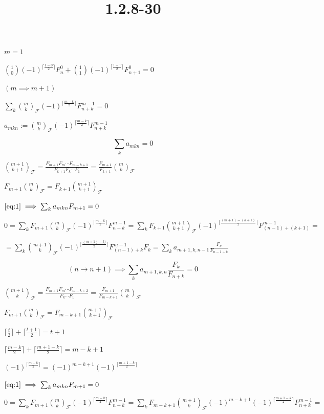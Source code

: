 \documentclass{article}
\title{1.2.8-30}
\begin{document}
\maketitle

$m = 1$

$\binom{1}{0}(-1)^{\lceil\frac{1-0}{2}\rceil} F_{n}^0 + \binom{1}{1}(-1)^{\lceil\frac{1-1}{2}\rceil} F_{n+1}^0 = 0$

$(m \implies m + 1)$

$\sum_{k}\binom{m}{k}_{\mathcal{F}}(-1)^{\lceil\frac{m-k}{2}\rceil}F_{n+k}^{m-1} = 0$

$a_{mkn} := \binom{m}{k}_{\mathcal{F}}(-1)^{\lceil\frac{m-k}{2}\rceil}F_{n+k}^{m-1}$

\[\sum_k a_{mkn} = 0 \tag{1}\label{eq:1}\]

$\binom{m+1}{k+1}_{\mathcal{F}} = \frac{F_{m+1}F_m\cdots F_{m-k+1}}{F_{k+1}F_k\cdots F_1} = \frac{F_{m+1}}{F_{k+1}} \binom{m}{k}_{\mathcal{F}}$

$F_{m+1} \binom{m}{k}_{\mathcal{F}} = F_{k+1} \binom{m+1}{k+1}_{\mathcal{F}}$

$\eqref{eq:1} \implies \sum_k a_{mkn}F_{m+1} = 0$

$0 = \sum_{k} F_{m+1}\binom{m}{k}_{\mathcal{F}}(-1)^{\lceil\frac{m-k}{2}\rceil}F_{n+k}^{m-1} = \sum_{k} F_{k+1}\binom{m+1}{k+1}_{\mathcal{F}}(-1)^{\lceil\frac{(m+1)-(k+1)}{2}\rceil}F_{(n-1)+(k+1)}^{m-1} =$

$= \sum_{k} \binom{m+1}{k}_{\mathcal{F}}(-1)^{\lceil\frac{(m+1)-k)}{2}\rceil}F_{(n-1)+k}^{m-1}F_{k} = \sum_k a_{m+1,k,n-1}\frac{F_k}{F_{n-1+k}}$

\[(n \to n + 1) \implies \sum_k a_{m+1,k,n}\frac{F_k}{F_{n+k}} = 0 \tag{2}\label{eq:2}\]

$\binom{m+1}{k}_{\mathcal{F}} = \frac{F_{m+1}F_m\cdots F_{m-k+2}}{F_k\cdots F_1} = \frac{F_{m+1}}{F_{m-k+1}} \binom{m}{k}_{\mathcal{F}}$

$F_{m+1} \binom{m}{k}_{\mathcal{F}} = F_{m-k+1} \binom{m+1}{k+1}_{\mathcal{F}}$

$\lceil \frac{t}{2} \rceil + \lceil \frac{t+1}{2} \rceil = t+1$

$\lceil \frac{m-k}{2} \rceil + \lceil \frac{m+1-k}{2} \rceil = m-k+1$

$(-1)^{\lceil \frac{m-k}{2} \rceil} = (-1)^{m-k+1} (-1)^{\lceil \frac{m + 1 -k}{2} \rceil}$

$\eqref{eq:1} \implies \sum_k a_{mkn}F_{m+1} = 0$

$0 = \sum_{k} F_{m+1}\binom{m}{k}_{\mathcal{F}}(-1)^{\lceil\frac{m-k}{2}\rceil}F_{n+k}^{m-1} = \sum_{k} F_{m-k+1}\binom{m+1}{k}_{\mathcal{F}}(-1)^{m-k+1} (-1)^{\lceil \frac{m + 1 -k}{2}\rceil}F_{n+k}^{m-1} =$
\end{document}
